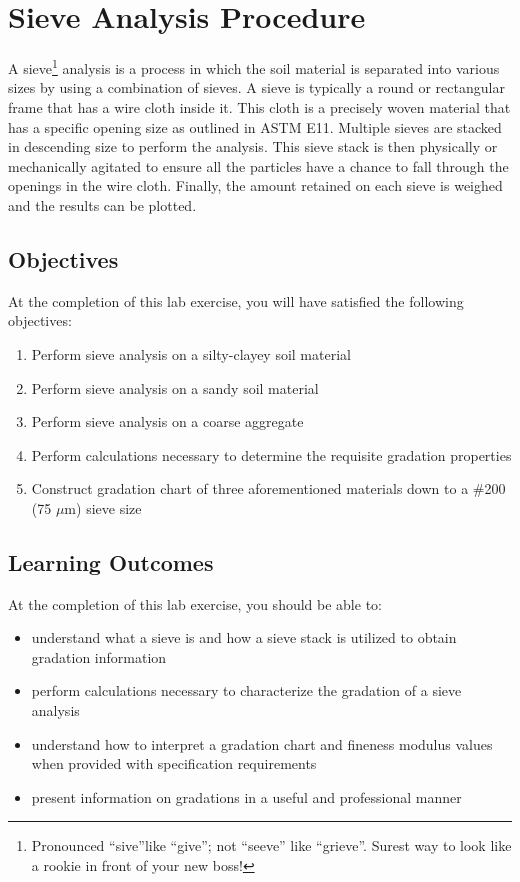 \documentclass[12pt]{article}
\begin{document}
\section{Sieve Analysis Procedure}
\label{sec:intro}
\normalsize 
A sieve\footnote{Pronounced ``sive''like ``give''; not ``seeve'' like ``grieve''. Surest way to look like a rookie in front of your new boss!} analysis is a process in which the soil material is separated into various sizes by using a combination of sieves. A sieve is typically a round or rectangular frame that has a wire cloth inside it. This cloth is a precisely woven material that has a specific opening size as outlined in ASTM E11. Multiple sieves are stacked in descending size to perform the analysis. This sieve stack is then physically or mechanically agitated to ensure all the particles have a chance to fall through the openings in the wire cloth. Finally, the amount retained on each sieve is weighed and the results can be plotted.

\subsection{Objectives}
\label{ssec:headingscap}
At the completion of this lab exercise, you will have satisfied the following objectives:
\begin{enumerate}
    \item Perform sieve analysis on a silty-clayey soil material
    \item Perform sieve analysis on a sandy soil material
    \item Perform sieve analysis on a coarse aggregate
    \item Perform calculations necessary to determine the requisite gradation properties
    \item Construct gradation chart of three aforementioned materials down to a \#200 (75 $\mu$m) sieve size
\end{enumerate}

\subsection{Learning Outcomes}
At the completion of this lab exercise, you should be able to:
\begin{itemize}
    \item understand what a sieve is and how a sieve stack is utilized to obtain gradation information
    \item perform calculations necessary to characterize the gradation of a sieve analysis
    \item understand how to interpret a gradation chart and fineness modulus values when provided with specification requirements
    \item present information on gradations in a useful and professional manner
\end{itemize}
\end{document}
